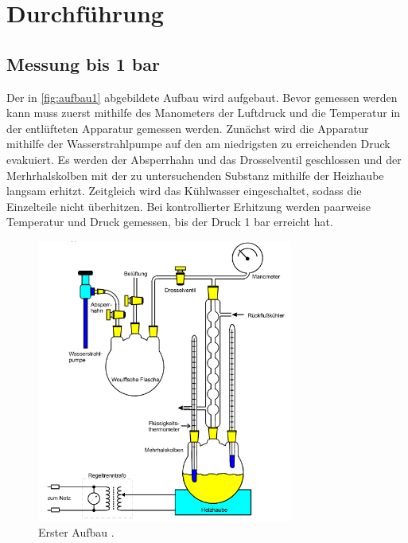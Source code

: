 \section{Durchführung}
\label{sec:Durchführung}

\subsection{Messung bis 1 bar}
Der in \autoref{fig:aufbau1} abgebildete Aufbau wird aufgebaut. Bevor gemessen werden kann muss zuerst mithilfe des Manometers
der Luftdruck und die Temperatur in der entlüfteten Apparatur gemessen werden. Zunächst wird die Apparatur mithilfe der 
Wasserstrahlpumpe auf den am niedrigsten zu erreichenden Druck evakuiert. Es werden der Absperrhahn und das Drosselventil geschlossen
und der Merhrhalskolben mit der zu untersuchenden Substanz mithilfe der Heizhaube langsam erhitzt.
Zeitgleich wird das Kühlwasser eingeschaltet, sodass die Einzelteile nicht überhitzen. Bei kontrollierter Erhitzung werden paarweise
Temperatur und Druck gemessen, bis der Druck 1 bar erreicht hat.

\begin{figure}[H]
    \centering
    \includegraphics[width=0.75\textwidth]{daten/aufbau1.png}
    \caption{Erster Aufbau \cite{anleitung}.}
    \label{fig:aufbau1}
\end{figure}

